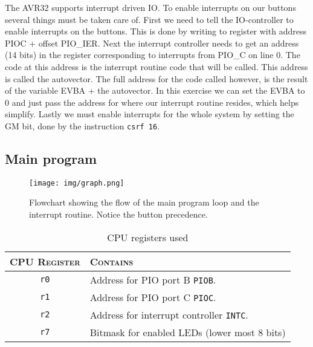 The AVR32 supports interrupt driven IO. To enable interrupts on our buttons several things must be taken care of. First we need to tell the IO-controller to enable interrupts on the buttons. This is done by writing to register with address PIOC + offset PIO\_IER. Next the interrupt controller needs to get an address (14 bits) in the register corresponding to interrupts from PIO\_C on line 0. The code at this address is the interrupt routine code that will be called. This address is called the autovector. The full address for the code called however, is the result of the variable EVBA + the autovector. In this exercise we can set the EVBA to 0 and just pass the address for where our interrupt routine resides, which helps simplify. Lastly we must enable interrupts for the whole system by setting the GM bit, done by the instruction \texttt{csrf 16}.



\subsection{Main program}
\begin{figure}[here]
\texttt{[image: img/graph.png]}
\caption{Flowchart showing the flow of the main program loop and the interrupt routine. Notice the button precedence.}
\label{fig:mainflow}
\end{figure}

\begin{table}
 \centering
 \begin{tabular}{| c | l |}
    \hline
    \textsc{CPU Register} & \textsc{Contains} \\ \hline
    \texttt{r0} &       Address for PIO port B \texttt{PIOB}. \\
    \texttt{r1} &       Address for PIO port C \texttt{PIOC}. \\
    \texttt{r2} &       Address for interrupt controller \texttt{INTC}. \\
    \texttt{r7} &	Bitmask for enabled LEDs (lower most 8 bits) \\
    \hline
 \end{tabular}
 \caption{CPU registers used}
 \label{table:cpuregs}
\end{table}

